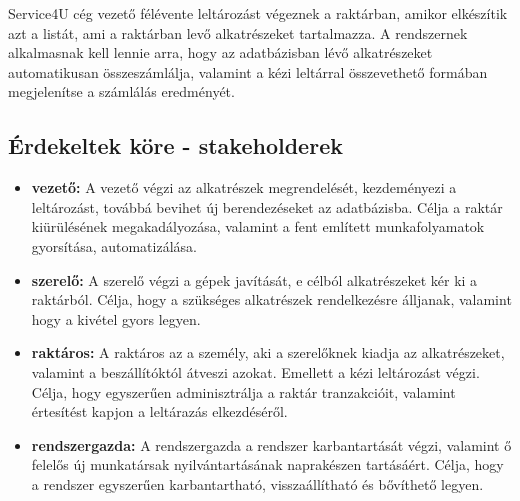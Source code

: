 \documentclass[12pt]{article}\usepackage[left=20mm,right=20mm,top=15mm,bottom=20mm]{geometry}
\begin{document}
Service4U cég vezető félévente leltározást végeznek a raktárban, amikor elkészítik azt a listát, ami a
raktárban levő alkatrészeket tartalmazza.
A rendszernek alkalmasnak kell lennie arra, hogy az adatbázisban lévő alkatrészeket automatikusan összeszámlálja, valamint a kézi leltárral összevethető formában megjelenítse a számlálás eredményét.


\subsection{Érdekeltek köre - stakeholderek}
\begin{itemize}
\item[] \textbf{vezető: } A vezető végzi az alkatrészek megrendelését, kezdeményezi a leltározást, továbbá bevihet új berendezéseket az adatbázisba. Célja a raktár kiürülésének megakadályozása, valamint a fent említett munkafolyamatok gyorsítása, automatizálása.

\item[] \textbf{szerelő: } A szerelő végzi a gépek javítását, e célból alkatrészeket kér ki a raktárból.  Célja, hogy a szükséges alkatrészek rendelkezésre álljanak, valamint hogy a kivétel gyors legyen.

\item[] \textbf{raktáros: } A raktáros az a személy, aki a szerelőknek kiadja az alkatrészeket, valamint a beszállítóktól átveszi azokat. Emellett a kézi leltározást végzi. Célja, hogy egyszerűen adminisztrálja a raktár tranzakcióit, valamint értesítést kapjon a leltárazás elkezdéséről.

\item[] \textbf{rendszergazda: } A rendszergazda a rendszer karbantartását végzi, valamint ő felelős új munkatársak nyilvántartásának naprakészen tartásáért. Célja, hogy a rendszer egyszerűen karbantartható, visszaállítható és bővíthető legyen.
\end{itemize}
\end{document}
